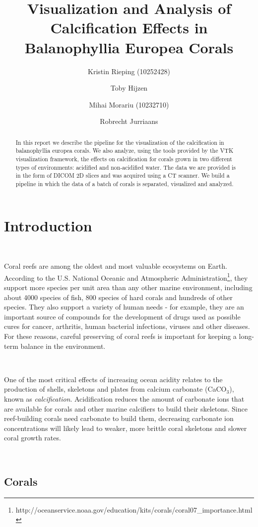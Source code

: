 \documentclass[12pt]{article}
\title{Visualization and Analysis of Calcification Effects in Balanophyllia Europea Corals}
\author{Kristin Rieping (10252428) \and Toby Hijzen \and Mihai Morariu (10232710) \and Robrecht Jurriaans}
\date{}
\begin{document}
\maketitle

\begin{abstract}
In this report we describe the pipeline for the visualization of the calcification in balanophyllia europea corals. We also analyze, using the tools provided by the VTK visualization framework, the effects on calcification for corals grown in two different types of environments: acidified and non-acidified water. The data we are provided is in the form of DICOM 2D slices and was acquired using a CT scanner. We build a pipeline in which the data of a batch of corals is separated, visualized and analyzed.
\end{abstract}

\section{Introduction}

\

Coral reefs are among the oldest and most valuable ecosystems on Earth. According to the U.S. National Oceanic and Atmospheric Administration\footnote{http://oceanservice.noaa.gov/education/kits/corals/coral07\_importance.html}, they support more species per unit area than any other marine environment, including about 4000 species of fish, 800 species of hard corals and hundreds of other species. They also support a variety of human needs - for example, they are an important source of compounds for the development of drugs used as possible cures for cancer, arthritis, human bacterial infections, viruses and other diseases. For these reasons, careful preserving of coral reefs is important for keeping a long-term balance in the environment. 

\

One of the most critical effects of increasing ocean acidity relates to the production of shells, skeletons and plates from calcium carbonate (CaCO$_3$), known as \emph{calcification}. Acidification reduces the amount of carbonate ions that are available for corals and other marine calcifiers to build their skeletons. Since reef-building corals need carbonate to build them, decreasing carbonate ion concentrations will likely lead to weaker, more brittle coral skeletons and slower coral growth rates.

\

\subsection{Corals}
\end{document}
